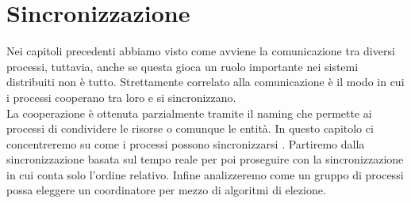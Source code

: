 \section{Sincronizzazione}
Nei capitoli precedenti abbiamo visto come avviene la comunicazione tra diversi processi, tuttavia, anche se questa gioca un ruolo importante nei sistemi distribuiti non è tutto. Strettamente correlato alla comunicazione è il modo in cui i processi cooperano tra loro e si sincronizzano.\\
La cooperazione è ottenuta parzialmente tramite il naming che permette ai processi di condividere le risorse o comunque le entità.
In questo capitolo ci concentreremo su come i processi possono sincronizzarsi . Partiremo dalla sincronizzazione basata sul tempo reale per poi proseguire con la sincronizzazione in cui conta solo l'ordine relativo. Infine analizzeremo come un gruppo di processi possa eleggere un coordinatore per mezzo di algoritmi di elezione.

